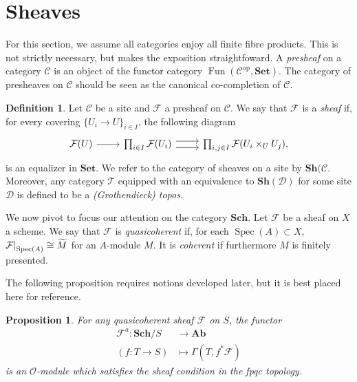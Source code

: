 \documentclass{amsart}
\newcommand{\Sch}{\mathbf{Sch}}
\newcommand{\Set}{\mathbf{Set}}
\newcommand{\Sh}{\mathbf{Sh}}
\newcommand{\Ab}{\mathbf{Ab}}
\DeclareMathOperator{\Fun}{Fun}
\DeclareMathOperator{\Spec}{Spec}
\newtheorem{proposition}[theorem]{Proposition}
\theoremstyle{definition}
\newtheorem{definition}[theorem]{Definition}
\theoremstyle{remark}
\newcommand\restr[2]{{%
  \left.\kern-\nulldelimiterspace %
  #1 %
  \vphantom{|} %
  \right|_{#2} %
  }}
\begin{document}
\section{Sheaves}

For this section, we assume all categories enjoy all finite fibre products. This
is not strictly necessary, but makes the exposition straightfoward. A
\textit{presheaf} on a category $\mathcal{C}$ is an object of the functor
category $\Fun(\mathcal{C}^{\text{op}}, \Set)$. The category of presheaves on
$\mathcal{C}$ should be seen as the canonical co-completion of $\mathcal{C}$.

\begin{definition}
    Let $\mathcal{C}$ be a site and $\mathcal{F}$ a presheaf on $\mathcal{C}$.
    We say that $\mathcal{F}$ is a \textit{sheaf} if, for every covering $\{U_i
    \to U\}_{i \in I}$, the following diagram
    \[
        \begin{tikzcd}
            \mathcal{F}(U) \ar[r] &
            \prod_{i \in I} \mathcal{F}(U_i) \ar[r, shift left=0.75ex] \ar[r,
            shift right=0.75ex] &
            \prod_{i, j \in I} \mathcal{F}(U_i \times_U U_j),
        \end{tikzcd}
    \]
    is an equalizer in $\Set$. We refer to the category of sheaves on a site by
    $\Sh(\mathcal{C}$. Moreover, any category $\mathcal{T}$ equipped with an
    equivalence to $\Sh(\mathcal{D})$ for some site $\mathcal{D}$ is defined to
    be a \textit{(Grothendieck) topos}.
\end{definition}

We now pivot to focus our attention on the category $\Sch$. Let $\mathcal{F}$ be
a sheaf on $X$ a scheme. We say that $\mathcal{F}$ is \textit{quasicoherent} if,
for each $\Spec(A) \subset X$, $\restr{\mathcal{F}}{\Spec(A)} \cong
\widetilde{M}$ for an $A$-module $M$. It is \textit{coherent} if furthermore
$M$ is finitely presented.

The following proposition requires notions developed later, but it is best
placed here for reference.

\begin{proposition}
    For any quasicoherent sheaf $\mathcal{F}$ on $S$, the functor
    \begin{align*}
        \mathcal{F}^a : \Sch/S &\to \Ab \\
        (f : T \to S) &\mapsto \Gamma(T, f^{\ast}\mathcal{F})
    \end{align*}
    is an $\mathcal{O}$-module which satisfies the sheaf condition in the fpqc
    topology.
\end{proposition}
\end{document}
